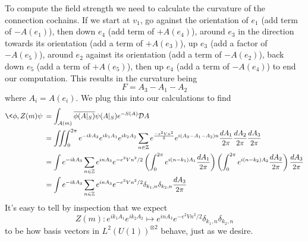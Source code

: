 To compute the field strength we need to calculate the curvature
of the connection cochains. If we start at $v_1$, go against the
orientation of $e_1$ (add term of $-A(e_{1})$), then down $e_4$
(add term of $+A(e_{4})$), around $e_3$ in the direction towards
its orientation (add a term of $+A(e_{3})$), up $e_{3}$ (add a
factor of $-A(e_{5})$), around $e_{2}$ against its orientation
(add a term of $-A(e_{2})$), back down $e_{5}$ (add a term of
$+A(e_{5})$), then up $e_{4}$ (add a term of $-A(e_{4})$) to end our computation.
This results in the curvature being
\begin{equation}%
F = A_{3}-A_{1}-A_{2}
\end{equation}
where $A_{i}=A(e_{i})$. We plug this into our calculations to find
\begin{subequations}%
\begin{align}
\<\phi,Z(m)\psi\> &= \int_{\mathcal{A}(m)}\overline{\phi(A|_{S})}\psi(A|_{S})e^{-S(A)}\mathcal{D}A\nonumber\\
&=  \iiint^{2\pi}_{0}
e^{-ikA_{3}}e^{ik_{1}A_{1}}e^{ik_{2}A_{2}}\sum_{n\in\mathbb{Z}}e^{\frac{-e^{2}Vn^{2}}{2}}e^{i(A_{3}-A_{1}-A_{2})n} \frac{dA_{1}}{2\pi}\frac{dA_{2}}{2\pi}\frac{dA_{3}}{2\pi}\\
&= \int e^{-ikA_{3}}\sum_{n\in\mathbb{Z}} e^{inA_{3}}e^{-e^{2}Vn^{2}/2}\left(\int^{2\pi}_{0}e^{i(n-k_{1})A_{1}}\frac{dA_{1}}{2\pi}\right)\left(\int^{2\pi}_{0}e^{i(n-k_{2})A_{2}}\frac{dA_{2}}{2\pi}\right)\frac{dA_{3}}{2\pi}\\
&= \int e^{-ikA_{3}}\sum_{n\in\mathbb{Z}} e^{inA_{3}} e^{-e^{2}Vn^{2}/2}\delta_{k_{1},n}\delta_{k_{2},n}\frac{dA_{3}}{2\pi}
\end{align}
\end{subequations}
It's easy to tell by inspection that we expect
\begin{equation}%
Z(m):e^{ik_{1}A_{1}}e^{ik_{2}A_{2}}\mapsto e^{inA_{3}} e^{-e^{2}Vn^{2}/2}\delta_{k_{1},n}\delta_{k_{2},n}
\end{equation}
to be how basis vectors in $L^{2}(U(1))^{\otimes 2}$ behave, just
as we desire.
